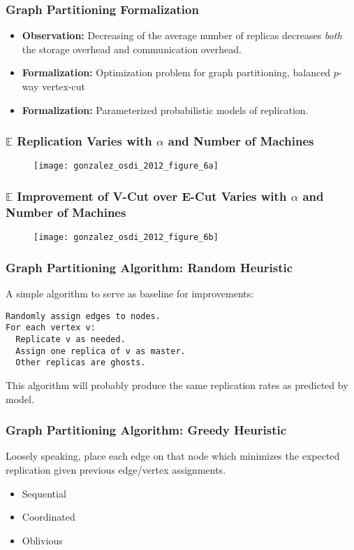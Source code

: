 \begin{frame}
  \frametitle{Graph Partitioning Formalization}
  \begin{itemize}
    \item \textbf{Observation:} Decreasing of the average number of replicas
          decreases \textit{both} the storage overhead and communication
          overhead.
    \item \textbf{Formalization:} Optimization problem for graph partitioning,
          balanced $p$-way vertex-cut
    \item \textbf{Formalization:} Parameterized probabilistic models of
          replication.
  \end{itemize}
\end{frame}

\begin{frame}
  \frametitle{$\mathbb{E}$ Replication Varies with $\alpha$ and Number of
              Machines}
  \begin{figure}
    \centering
    \texttt{[image: gonzalez\_osdi\_2012\_figure\_6a]}
    \caption{\cite[OSDI '12]{gonzalez2012powergraph}}
  \end{figure}
\end{frame}

\begin{frame}
  \frametitle{$\mathbb{E}$ Improvement of V-Cut over E-Cut Varies with $\alpha$
              and Number of Machines}
  \begin{figure}
    \centering
    \texttt{[image: gonzalez\_osdi\_2012\_figure\_6b]}
    \caption{\cite[OSDI '12]{gonzalez2012powergraph}}
  \end{figure}
\end{frame}

\begin{frame}[fragile]
  \frametitle{Graph Partitioning Algorithm: Random Heuristic}
  A simple algorithm to serve as baseline for improvements:
\begin{lstlisting}
Randomly assign edges to nodes.
For each vertex v:
  Replicate v as needed.
  Assign one replica of v as master.
  Other replicas are ghosts.
\end{lstlisting}
  This algorithm will probably produce the same replication rates as predicted
  by model.
\end{frame}


\begin{frame}
  \frametitle{Graph Partitioning Algorithm: Greedy Heuristic}
  Loosely speaking, place each edge on that node which minimizes the expected
  replication given previous edge/vertex assignments.
  \begin{itemize}
    \item Sequential
    \item Coordinated
    \item Oblivious
  \end{itemize}
\end{frame}


